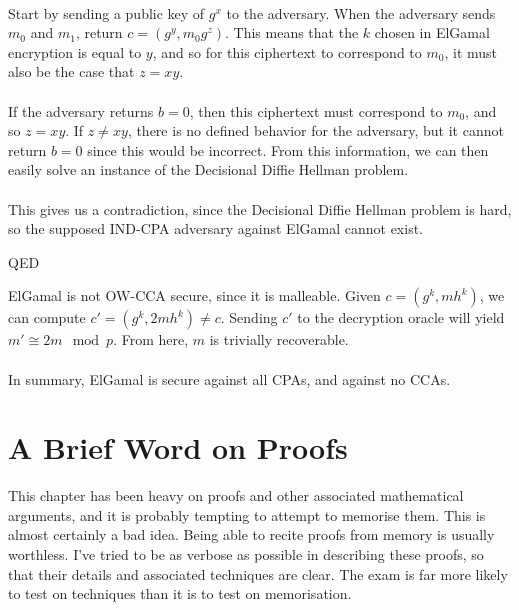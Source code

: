 \\
	Start by sending a public key of $g^x$ to the adversary. When the adversary sends $m_0$ and $m_1$, return $c = (g^y, m_0g^z)$. This means that the $k$ chosen in ElGamal encryption is equal to $y$, and so for this ciphertext to correspond to $m_0$, it must also be the case that $z = xy$.\\
\\
	If the adversary returns $b=0$, then this ciphertext must correspond to $m_0$, and so $z=xy$. If $z \neq xy$, there is no defined behavior for the adversary, but it cannot return $b=0$ since this would be incorrect. From this information, we can then easily solve an instance of the Decisional Diffie Hellman problem.\\
\\
	This gives us a contradiction, since the Decisional Diffie Hellman problem is hard, so the supposed IND-CPA adversary against ElGamal cannot exist.
\begin{flushright}
QED\\
\end{flushright}
	ElGamal is not OW-CCA secure, since it is malleable. Given $c=(g^k,mh^k)$, we can compute $c'=(g^k,2mh^k) \neq c$. Sending $c'$ to the decryption oracle will yield $m' \cong 2m \mod p$. From here, $m$ is trivially recoverable.\\
\\
	In summary, ElGamal is secure against all CPAs, and against no CCAs.\\

\section{A Brief Word on Proofs}

	This chapter has been heavy on proofs and other associated mathematical arguments, and it is probably tempting to attempt to memorise them. This is almost certainly a bad idea. Being able to recite proofs from memory is usually worthless. I've tried to be as verbose as possible in describing these proofs, so that their details and associated techniques are clear. The exam is far more likely to test on techniques than it is to test on memorisation.
